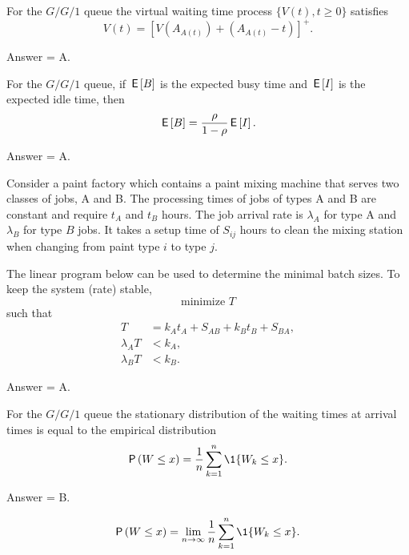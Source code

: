 \begin{exercise}[201704]%
For the $G/G/1$ queue the virtual waiting time process $\{V(t), t\geq 0\}$ 
satisfies
 \begin{equation*}
 V(t) = [V(A_{A(t)}) + (A_{A(t)}-t)]^+.
 \end{equation*}
\begin{solution} Answer = A.
\end{solution}
\end{exercise}

\begin{exercise}[201704]%
 For the $G/G/1$ queue, if $\,\mathsf{E}\left[B\right]$ is the expected busy time and
 $\,\mathsf{E}\left[I\right]$ is the expected idle time, then
\begin{equation*}
 \,\mathsf{E}\left[B\right] = \frac{\rho }{1-\rho} \,\mathsf{E}\left[I\right]. 
\end{equation*}
\begin{solution} Answer = A.
\end{solution}
\end{exercise}

\begin{exercise}[201704]%
 Consider a paint factory which contains a paint mixing machine that
 serves two classes of jobs, A and B. The processing times of jobs of
 types A and B are constant and require $t_A$ and $t_B$ hours. The
 job arrival rate is $\lambda_A$ for type A and $\lambda_B$ for type
 $B$ jobs. It takes a setup time of $S_{i j}$ hours to clean the mixing
 station when changing from paint type $i$ to type $j$.

 The linear program below can be used to determine the minimal batch
 sizes. To keep the system (rate) stable,
\begin{equation*}
 \text{minimize } T
\end{equation*}
such that
\begin{align*}
 T&= k_A t_A + S_{AB} + k_B t_B + S_{BA}, \\
 \lambda_A T &< k_A, \\
 \lambda_B T &< k_B.
\end{align*}

\begin{solution} Answer = A.
\end{solution}
\end{exercise}

\begin{exercise}[201704]%
 For the $G/G/1$ queue the stationary distribution of
 the waiting times at arrival times is equal to the empirical distribution
\begin{equation*}
 \P{W \leq x} = \frac 1n\sum_{k=1}^n \1{W_k\leq x}.
\end{equation*}
\begin{solution} Answer = B.
 
\begin{equation}
 \P{W \leq x} = \lim_{n\to\infty} \frac 1n\sum_{k=1}^n \1{W_k\leq x}.
\end{equation}

\end{solution}
\end{exercise}



